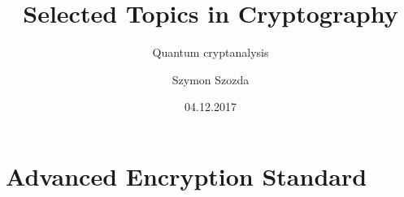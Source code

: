 \documentclass[compress]{beamer} %
\title{Selected Topics in Cryptography}
\subtitle{Quantum cryptanalysis}
\author[]{Szymon Szozda}
\institute[KT AGH]{Department of Telecommunications}
\date{04.12.2017}
\begin{document}
	\begin{frame}
    	\titlepage
	\end{frame}


\renewcommand{\logosinfootline}{\raisebox{0.12cm}{\begin{beamercolorbox}{rafi}{Selected Topics in Cryptography \quad \insertframenumber/\inserttotalframenumber}\end{beamercolorbox}}}
\section{Advanced Encryption Standard} 





%

%

\end{document}
